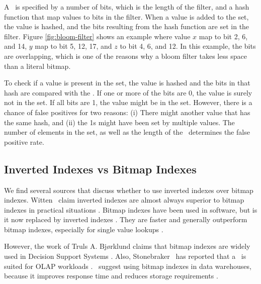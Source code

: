 
A \bloom~is specified by a number of bits, which is the length of the filter, and a hash function that map values to bits in the filter. When a value is added to the set, the value is hashed, and the bits resulting from the hash function are set in the filter. Figure \ref{fig:bloom-filter} shows an example where value $x$ map to bit 2, 6, and 14, $y$ map to bit 5, 12, 17, and $z$ to bit 4, 6, and 12. In this example, the bits are overlapping, which is one of the reasons why a bloom filter takes less space than a literal bitmap.

To check if a value is present in the set, the value is hashed and the bits in that hash are compared with the \bloom. If one or more of the bits are 0, the value is surely not in the set. If all bits are 1, the value might be in the set. However, there is a chance of false positives for two reasons: (i) There might another value that has the same hash, and (ii) the 1s might have been set by multiple values. The number of elements in the set, as well as the length of the \bloom~determines the false positive rate.


\subsection{Inverted Indexes vs Bitmap Indexes}
\label{sub:Inverted Indexes vs Bitmap Indexes}
We find several sources that discuss whether to use inverted indexes over bitmap indexes. Witten \ea~claim inverted indexes are almost always superior to bitmap indexes in practical situations \cite{Witten1999-qq}. Bitmap indexes have been used in  software, but is it now replaced by inverted indexes \cite{Bjorklund2011-wh}. They are faster and generally outperform bitmap indexes, especially for single value lookups \cite{Moffat1992-tz}.

However, the work of Truls A. Bjørklund claims that bitmap indexes are widely used in Decision Support Systems \cite{Bjorklund2011-wh}. Also, Stonebraker \ea~has reported that a \biti~is suited for OLAP workloads \cite{Stonebraker2005-qz}. \oracle~suggest using bitmap indexes in data warehouses, because it improves response time and reduces storage requirements \cite{noauthor_undated-hp}.

